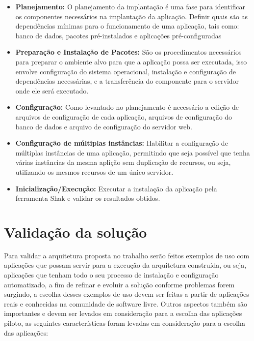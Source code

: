 \begin{itemize}
  \item  \textbf{Planejamento:} O planejamento da implantação é uma fase para
  identificar os componentes necessários na implantação da aplicação. Definir
  quais são as dependências mínimas
  para o funcionamento de uma aplicação, tais como: banco de dados, pacotes
  pré-instalados e aplicações pré-configuradas
  \item  \textbf{Preparação e Instalação de Pacotes:} São os procedimentos necessários
   para preparar o ambiente alvo para que a aplicação
  possa ser executada, isso envolve configuração do sistema operacional, instalação
  e configuração de dependências necessárias, e a transferência do componente
  para o servidor onde ele será executado.
  \item  \textbf{Configuração:} Como levantado no planejamento é necessário a
  edição de arquivos de configuração
  de cada aplicação, arquivos de configuração do banco de dados e arquivo de configuração
  do servidor web.
  \item  \textbf{Configuração de múltiplas instâncias:} Habilitar a configuração
  de múltiplas instâncias de uma aplicação, permitindo que seja possível que
  tenha várias instâncias da mesma aplição sem duplicação de recursos, ou seja,
  utilizando os mesmos recursos de um único servidor.
  \item  \textbf{Inicialização/Execução:} Executar a instalação da aplicação pela
  ferramenta Shak e validar os resultados obtidos.
\end{itemize}

\section{Validação da solução}
\label{subsection:validacao}

Para validar a arquitetura proposta no trabalho serão feitos exemplos de uso
com aplicações que possam servir para a execução da arquitetura construída, ou seja,
aplicações que tenham todo o seu processo de instalação e configuração automatizado, a
fim de refinar e evoluir a solução conforme problemas forem surgindo, a escolha
desses exemplos de uso devem ser feitas a partir de aplicações reais e
conhecidas na comunidade de software livre. Outros aspectos também são importantes e
devem ser levados em consideração para a escolha das
aplicações piloto, as seguintes características foram levadas em consideração
para a escolha das aplicações:

